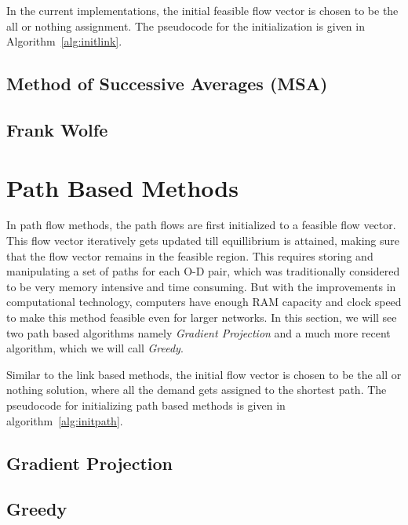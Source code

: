 In the current implementations, the initial feasible flow
vector is chosen to be the all or nothing assignment. The
pseudocode for the initialization is given in Algorithm~\ref{alg:initlink}.



\subsection{Method of Successive Averages (MSA)}


\subsection{Frank Wolfe}


\section{Path Based Methods}
In path flow methods, the path flows are first initialized to a
feasible flow vector. This flow vector iteratively gets updated
till equillibrium is attained, making sure that the flow
vector remains in the feasible region.
This requires storing and manipulating a set of paths for each O-D
pair, which was traditionally considered to be very memory intensive
and time consuming. But with the improvements in computational
technology, computers have enough RAM capacity and clock speed
to make this method feasible even for larger networks.
In this section, we will see two path based algorithms namely
\emph{Gradient Projection} and a much more recent algorithm,
which we will call \emph{Greedy}\cite{xie}.

Similar to the link based methods, the initial flow vector is
chosen to be the all or nothing solution, where all the demand
gets assigned to the shortest path. The pseudocode for initializing
path based methods is given in algorithm~\ref{alg:initpath}.

\subsection{Gradient Projection}


\subsection{Greedy}

